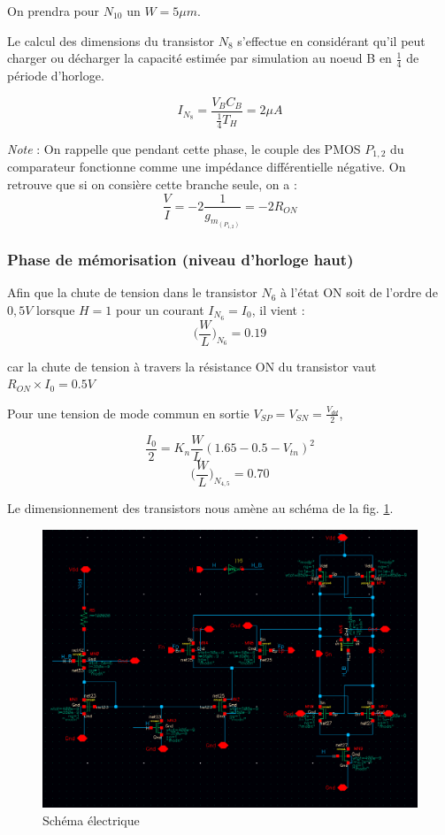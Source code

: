\documentclass[11pt]{article}
\begin{document}
On prendra pour $N_{10}$ un $W = 5 \mu m$.

Le calcul des dimensions du transistor $N_8$ s'effectue en consid\'erant qu'il peut charger ou d\'echarger
la capacit\'e estim\'ee par simulation au noeud B en $\frac{1}{4}$ de p\'eriode d'horloge.

\[
I_{N_8} = \frac {V_B C_B}{\frac{1}{4} T_H} = 2 \mu A
\]

\textit{Note} : On rappelle que pendant cette phase, le couple des PMOS $P_{1,2}$ du comparateur fonctionne comme une imp\'edance diff\'erentielle n\'egative\cite{Razavi-Data-Conversion}. On retrouve que si on consi\`ere cette branche seule, on a :
\[
\frac{V}{I}= -2 \frac{1}{g_m_{(P_{1,2})}} = -2 R_{ON}
\]


\subsubsection{Phase de m\'emorisation (niveau d'horloge haut)}

Afin que la chute de tension dans le transistor $N_6$  \`a l'\'etat ON soit de l'ordre de $0,5 V$ lorsque $H=1$
pour un courant $I_{N_6}= I_0$, il vient :
\[
  \bigg(\frac{W}{L} \bigg)_{N_6} = 0.19
\]

car la chute de tension \`a travers la r\'esistance ON du transistor vaut $R_{ON} \times I_0 = 0.5V$

Pour une tension de mode commun en sortie $V_{SP}=V_{SN} = \frac{V_{dd}}{2}$,

\[
  \frac{I_0}{2} = K_n \frac{W}{L}(1.65-0.5 - V_{tn})^2
\]
\[
  \bigg(\frac{W}{L} \bigg)_{N_{4,5}} = 0.70
\]

Le dimensionnement des transistors nous am\`ene au sch\'ema de la fig. \ref{fig:schcomp}.


\clearpage

\begin{figure}[!htb]
      \centering
      \includegraphics[width=0.8\linewidth]{comparateur_schema_cadence_.png}
      \caption{Sch\'ema \'electrique}
      \label{fig:schcomp}
\end{figure}%
\end{document}
